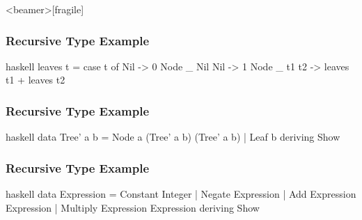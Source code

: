 \documentclass[dvipsnames]{beamer}
\theoremstyle{plain}
\begin{document}
\begin{frame}<beamer>[fragile]
  \frametitle{Recursive Type Example}

  \begin{example}
    \pause
    \begin{pygments}{haskell}
leaves t =
    case t of
      Nil -> 0
      Node _ Nil Nil -> 1
      Node _ t1 t2 -> leaves t1 + leaves t2
    \end{pygments}
  \end{example}
\end{frame}

\begin{frame}[fragile]
  \frametitle{Recursive Type Example}

  \begin{example}
    \begin{pygments}{haskell}
data Tree' a b =
    Node a (Tree' a b) (Tree' a b)
  | Leaf b
  deriving Show
    \end{pygments}
  \end{example}
\end{frame}

\begin{frame}[fragile]
  \frametitle{Recursive Type Example}

  \begin{example}
    \begin{pygments}{haskell}
data Expression = Constant Integer
                | Negate Expression
                | Add Expression Expression
                | Multiply Expression Expression
                deriving Show
    \end{pygments}
  \end{example}
\end{frame}
\end{document}
